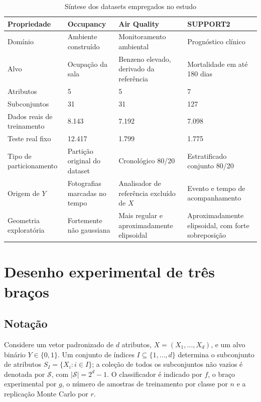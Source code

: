 \begin{table}[H]
  \centering
  \caption{Síntese dos datasets empregados no estudo}
  \label{tab:datasets-comparison}
  \begin{tabularx}{\textwidth}{>{\raggedright\arraybackslash}p{3.2cm}XXX}
    \toprule
    Propriedade & Occupancy & Air Quality & SUPPORT2 \\
    \midrule
    Domínio & Ambiente construído & Monitoramento ambiental & Prognóstico clínico \\
    Alvo & Ocupação da sala & Benzeno elevado, derivado da referência & Mortalidade em até 180 dias \\
    Atributos & 5 & 5 & 7 \\
    Subconjuntos & 31 & 31 & 127 \\
    Dados reais de treinamento & 8.143 & 7.192 & 7.098 \\
    Teste real fixo & 12.417 & 1.799 & 1.775 \\
    Tipo de particionamento & Partição original do dataset & Cronológico 80/20 & Estratificado conjunto 80/20 \\
    Origem de $Y$ & Fotografias marcadas no tempo & Analisador de referência excluído de $X$ & Evento e tempo de acompanhamento \\
    Geometria exploratória & Fortemente não gaussiana & Mais regular e aproximadamente elipsoidal & Aproximadamente elipsoidal, com forte sobreposição \\
    \bottomrule
  \end{tabularx}
\end{table}

\section{Desenho experimental de três braços}

\subsection{Notação}

Considere um vetor padronizado de $d$ atributos, $X=(X_1,\ldots,X_d)$, e um alvo binário $Y\in\{0,1\}$. Um conjunto de índices $I\subseteq\{1,\ldots,d\}$ determina o subconjunto de atributos $S_I=\{X_i:i\in I\}$; a coleção de todos os subconjuntos não vazios é denotada por $\mathcal{S}$, com $|\mathcal{S}|=2^d-1$. O classificador é indicado por $f$, o braço experimental por $g$, o número de amostras de treinamento por classe por $n$ e a replicação Monte Carlo por $r$.

